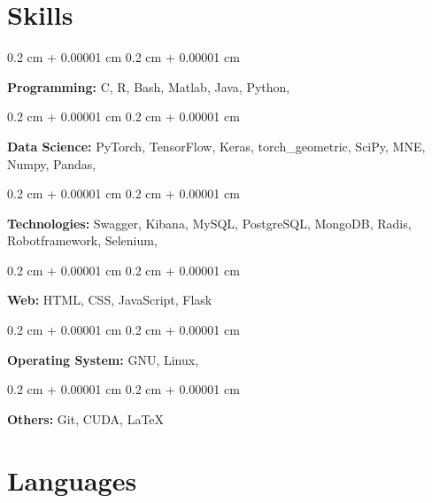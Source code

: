 \documentclass[10pt, letterpaper]{article}
\newenvironment{onecolentry}{
    \begin{adjustwidth}{
        0.2 cm + 0.00001 cm
    }{
        0.2 cm + 0.00001 cm
    }
}{
    \end{adjustwidth}
} %
\begin{document}
    
    \section{Skills}



        
        \begin{onecolentry}
            \textbf{Programming:} C, R, Bash, Matlab, Java, Python,
        \end{onecolentry}

        \vspace{0.2 cm}
        
        \begin{onecolentry}
        	\textbf{Data Science:} PyTorch, TensorFlow, Keras, torch\_geometric, SciPy, MNE, Numpy, Pandas,
        \end{onecolentry}
        
        \vspace{0.2 cm}
        
        \begin{onecolentry}
            \textbf{Technologies:} Swagger, Kibana, MySQL, PostgreSQL, MongoDB, Radis, Robotframework, Selenium,
        \end{onecolentry}
        
        \vspace{0.2 cm}
        
        \begin{onecolentry}
        	\textbf{Web:} HTML, CSS, JavaScript, Flask
        \end{onecolentry}
        
        \vspace{0.2 cm}
        
         \begin{onecolentry}
        	\textbf{Operating System:} GNU, Linux,
        \end{onecolentry}
        
        \vspace{0.2 cm}
        
        \begin{onecolentry}
        	\textbf{Others:} Git, CUDA, \LaTeX
        \end{onecolentry}
        
        \vspace{0.2 cm}


\section{Languages}
\end{document}
